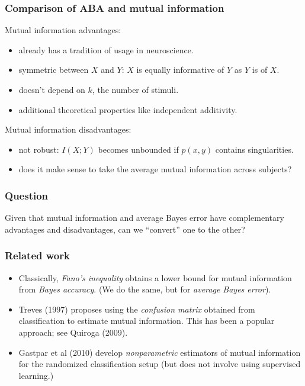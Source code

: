 \documentclass{beamer}
\begin{document}
\begin{frame}
\frametitle{Comparison of ABA and mutual information}
Mutual information advantages:
\begin{itemize}
\item already has a tradition of usage in neuroscience.
\item symmetric between $X$ and $Y$: $X$ is equally informative of $Y$ as $Y$ is of $X$.
\item doesn't depend on $k$, the number of stimuli.
\item additional theoretical properties like independent additivity.
\end{itemize}
Mutual information disadvantages:
\begin{itemize}
\item not robust: $I(X; Y)$ becomes unbounded if $p(x,y)$ contains singularities.
\item does it make sense to take the average mutual information across subjects?
\end{itemize}
\end{frame}

\begin{frame}
\frametitle{Question} Given that mutual information and average Bayes
error have complementary advantages and disadvantages, can we
``convert'' one to the other?
\end{frame}

\begin{frame}
\frametitle{Related work}
\begin{itemize}
\item Classically, \emph{Fano's inequality} obtains a lower bound for
  mutual information from \emph{Bayes accuracy}.  (We do the same, but
  for \emph{average Bayes error}).
\item Treves (1997) proposes using the \emph{confusion matrix}
  obtained from classification to estimate mutual information.  This
  has been a popular approach; see Quiroga (2009).
\item Gastpar et al (2010) develop \emph{nonparametric} estimators of
  mutual information for the randomized classification setup (but does
  not involve using supervised learning.)
\end{itemize}
\end{frame}
\end{document}

